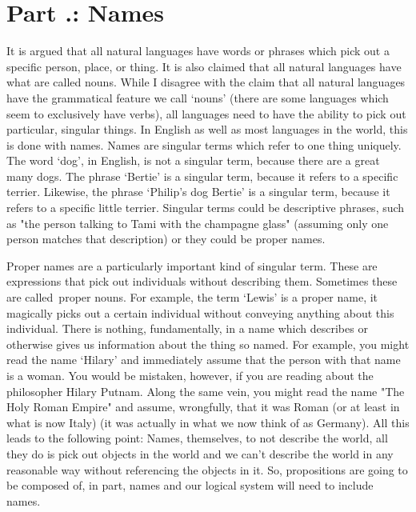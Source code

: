 \section{Part \thechapcount.\theseccount: Names}
It is argued that all natural languages have words or phrases which pick out a specific person, place, or thing. It is also claimed that all natural languages have what are called nouns. While I disagree with the claim that all natural languages have the grammatical feature we call ‘nouns' (there are some languages which seem to exclusively have verbs), all languages need to have the ability to pick out particular, singular things. In English as well as most languages in the world, this is done with \glspl{name}. Names are singular terms which refer to one thing uniquely. The word ‘dog’, in English, is not a singular term, because there are a great many dogs. The phrase ‘Bertie’ is a singular term, because it refers to a specific terrier. Likewise, the phrase ‘Philip’s dog Bertie’ is a singular term, because it refers to a specific little terrier. Singular terms could be descriptive phrases, such as "the person talking to Tami with the champagne glass" (assuming only one person matches that description) or they could be proper names.

Proper names are a particularly important kind of singular term. These are expressions that pick out individuals without describing them. Sometimes these are called proper nouns. For example, the term ‘Lewis' is a proper name, it magically picks out a certain individual without conveying anything about this individual. There is nothing, fundamentally, in a name which describes or otherwise gives us information about the thing so named. For example, you might read the name ‘Hilary' and immediately assume that the person with that name is a woman. You would be mistaken, however, if you are reading about the philosopher Hilary Putnam. Along the same vein, you might read the name "The Holy Roman Empire" and assume, wrongfully, that it was Roman (or at least in what is now Italy) (it was actually in what we now think of as Germany). All this leads to the following point: Names, themselves, to not describe the world, all they do is pick out objects in the world and we can't describe the world in any reasonable way without referencing the objects in it. So, propositions are going to be composed of, in part, names and our logical system will need to include names.


